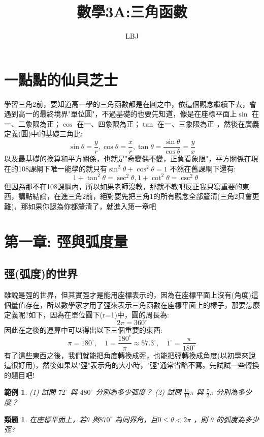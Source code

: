 \documentclass{article}
\title{數學3A:三角函數}
\author{LBJ}
\newtheorem{example}{範例}[section]
\newtheorem{exercise}{類題}[section]
\begin{document}
\maketitle

\section{一點點的仙貝芝士}

學習三角2前，要知道高一學的三角函數都是在圓之中，依這個觀念繼續下去，會遇到高一的最終境界"單位圓"，不過基礎的也要先知道，像是在座標平面上$\sin$ 在一、二象限為正；$\cos$ 在一、四象限為正；$\tan$ 在一、三象限為正
，然後在廣義定義(圓)中的基礎三角比:
\[\boxed{\sin \theta = \frac{y}{r}, \cos \theta = \frac{x}{r}, \tan \theta = \frac{\sin \theta}{\cos \theta} = \frac{y}{x}}\]
以及最基礎的換算和平方關係，也就是"奇變偶不變，正負看象限"，平方關係在現在的108課綱下唯一能學的就只有$\sin^2\theta + \cos^2\theta = 1$ 不然在舊課綱下還有:
\[\boxed{\quad1 + \tan^2\theta = \sec^2\theta, 1 + \cot^2\theta = \csc^2\theta}\]
但因為那不在108課綱內，所以如果老師沒教，那就不教吧反正我只寫重要的東西，講點結論，在進三角2前，絕對要先把三角1的所有觀念全部釐清(三角2只會更難)，那如果你認為你都釐清了，就進入第一章吧
\section{第一章: 弳與弧度量}

\subsection{弳(弧度)的世界}

 雖說是弳的世界，但其實弳才是能用座標表示的，因為在座標平面上沒有(角度)這個量值存在，所以數學家才用了弳來表示三角函數在座標平面上的樣子，那要怎麼定義呢?如下，因為在單位圓下(r=1)中，圓的周長為:
\[\boxed{2\pi = 360^\circ} \]
因此在之後的運算中可以得出以下三個重要的東西:
\[ \boxed{\pi = 180^\circ, \quad1 = \frac{180^\circ}{\pi} \approx 57.3^\circ, \quad1^\circ=\frac{\pi}{180^\circ}} \]
有了這些東西之後，我們就能把角度轉換成弳，也能把弳轉換成角度(以初學來說這很好用)，然後如果以"弳"表示角的大小時，"弳"通常省略不寫。先試試一些轉換的題目吧!

\begin{example}
\normalfont 
(1) 試問 $72^\circ$ 與 $480^\circ$ 分別為多少弧度？   (2) 試問 $\frac{11}{12}\pi$ 與 $\frac{7}{2}\pi$ 分別為多少度？
\end{example}
\begin{exercise}
\normalfont
    在座標平面上，若$\theta$ 與$870^\circ$ 為同界角，且$0\le \theta < 2\pi$ ，則 $\theta$ 的弧度為多少弳? 
\end{exercise}
\end{document}
